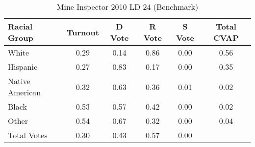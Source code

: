\begin{table}[htb]
\begin{center}
\caption{Mine Inspector 2010 LD 24 (Benchmark)}
\label{smine_cvap_ld_24_benchmark}
\begin{tabular}{lccccc}
  \hline
Racial Group & Turnout & D Vote & R Vote & S Vote & Total CVAP \\ 
  \hline
White & 0.29 & 0.14 & 0.86 & 0.00 & 0.56 \\ 
  Hispanic & 0.27 & 0.83 & 0.17 & 0.00 & 0.35 \\ 
  Native American & 0.32 & 0.63 & 0.36 & 0.01 & 0.02 \\ 
  Black & 0.53 & 0.57 & 0.42 & 0.00 & 0.02 \\ 
  Other & 0.54 & 0.67 & 0.32 & 0.00 & 0.04 \\ 
  Total Votes & 0.30 & 0.43 & 0.57 & 0.00 &  \\ 
   \hline
\end{tabular}
\end{center}
\end{table}
